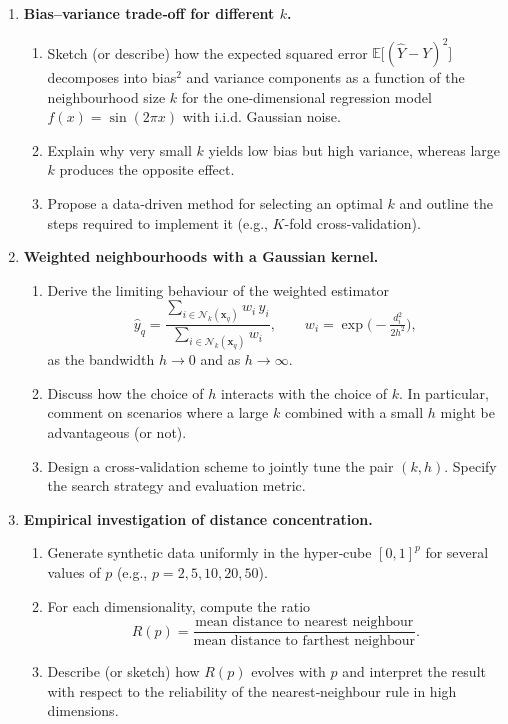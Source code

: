 \documentclass[12pt, a4paper]{article}
\begin{document}
\begin{enumerate}
    \item \textbf{Bias–variance trade‑off for different \(k\).}
    \begin{enumerate}
        \item Sketch (or describe) how the expected squared error \(\mathbb{E}\big[(\hat Y - Y)^2\big]\) decomposes into bias\(^2\) and variance components as a function of the neighbourhood size \(k\) for the one‑dimensional regression model \(f(x)=\sin(2\pi x)\) with i.i.d. Gaussian noise.
        \item Explain why very small \(k\) yields low bias but high variance, whereas large \(k\) produces the opposite effect.
        \item Propose a data‑driven method for selecting an optimal \(k\) and outline the steps required to implement it (e.g., \(K\)-fold cross‑validation).
    \end{enumerate}
    
    \item \textbf{Weighted neighbourhoods with a Gaussian kernel.}
    \begin{enumerate}
        \item Derive the limiting behaviour of the weighted estimator
        \[
        \hat y_q = \frac{\sum_{i\in\mathcal N_k(\mathbf x_q)} w_i\,y_i}
                        {\sum_{i\in\mathcal N_k(\mathbf x_q)} w_i},
        \qquad
        w_i = \exp\!\bigl(-\tfrac{d_i^{2}}{2h^{2}}\bigr),
        \]
        as the bandwidth \(h\to 0\) and as \(h\to\infty\).
        \item Discuss how the choice of \(h\) interacts with the choice of \(k\). In particular, comment on scenarios where a large \(k\) combined with a small \(h\) might be advantageous (or not).
        \item Design a cross‑validation scheme to jointly tune the pair \((k,h)\). Specify the search strategy and evaluation metric.
    \end{enumerate}
    
    \item \textbf{Empirical investigation of distance concentration.}
    \begin{enumerate}
        \item Generate synthetic data uniformly in the hyper‑cube \([0,1]^p\) for several values of \(p\) (e.g., \(p=2,5,10,20,50\)).
        \item For each dimensionality, compute the ratio
        \[
        R(p)=\frac{\text{mean distance to nearest neighbour}}{\text{mean distance to farthest neighbour}}.
        \]
        \item Describe (or sketch) how \(R(p)\) evolves with \(p\) and interpret the result with respect to the reliability of the nearest‑neighbour rule in high dimensions.
    \end{enumerate}
    

\end{enumerate}
\end{document}
